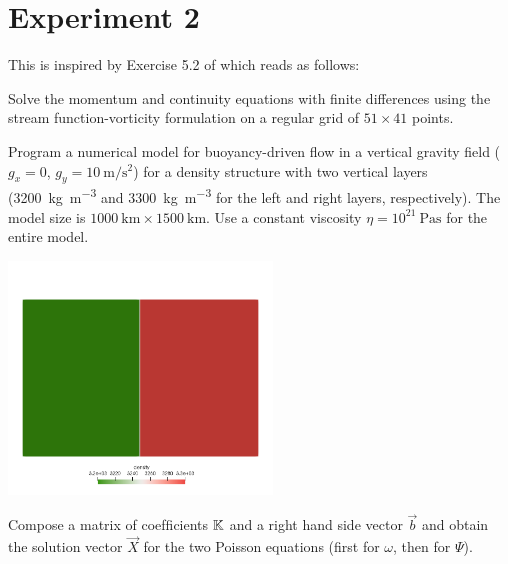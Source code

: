 \section*{Experiment 2}

This is inspired by Exercise 5.2 of \textcite{gery19book} which reads as 
follows:

Solve the momentum and continuity equations with ﬁnite differences using the stream
function-vorticity formulation 
on a regular grid of $51\times 41$ points. 

Program a numerical model for buoyancy-driven ﬂow in a vertical 
gravity ﬁeld ($g_x=0$, $g_y=10~\si{\meter\per\square\second}$) 
for a density structure with two vertical layers 
(3200~\si{\kg\per\cubic\meter} and 3300~\si{\kg\per\cubic\meter} 
for the left and right layers, respectively). The model size is 
$1000~\si{\km} \times 1500~\si{\km}$.
Use a constant viscosity $\eta = 10^{21}~\si{\pascal\second}$ 
for the entire model.

\begin{center}
\includegraphics[width=7cm]{python_codes/fieldstone_153/results/exp2/rho}
\end{center}

Compose a matrix of coefﬁcients ${\mathbb{K}}$ and a right hand side vector $\vec{b}$ 
and obtain the solution vector $\vec{X}$ 
for the two Poisson equations (ﬁrst for $\omega$, then for $\Psi$). 


